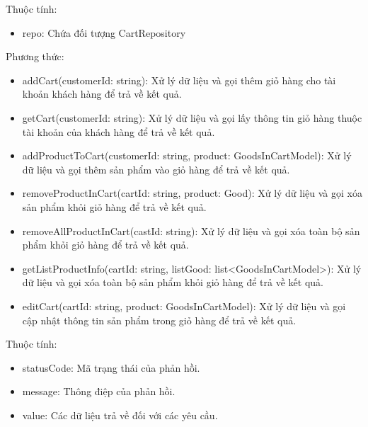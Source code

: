 Thuộc tính:
\begin{itemize}
	\item repo: Chứa đối tượng CartRepository
\end{itemize}
Phương thức:
\begin{itemize}
	\item addCart(customerId: string): Xử lý dữ liệu và gọi thêm giỏ hàng cho tài khoản khách hàng để trả về kết quả.
	\item getCart(customerId: string): Xử lý dữ liệu và gọi lấy thông tin giỏ hàng thuộc tài khoản của khách hàng để trả về kết quả.
	\item addProductToCart(customerId: string, product: GoodsInCartModel): Xử lý dữ liệu và gọi thêm sản phẩm vào giỏ hàng để trả về kết quả.
	\item removeProductInCart(cartId: string, product: Good): Xử lý dữ liệu và gọi xóa sản phẩm khỏi giỏ hàng để trả về kết quả.
	\item removeAllProductInCart(castId: string): Xử lý dữ liệu và gọi xóa toàn bộ sản phẩm khỏi giỏ hàng để trả về kết quả.
	\item getListProductInfo(cartId: string, listGood: list<GoodsInCartModel>): Xử lý dữ liệu và gọi xóa toàn bộ sản phẩm khỏi giỏ hàng để trả về kết quả.
	\item editCart(cartId: string, product: GoodsInCartModel): Xử lý dữ liệu và gọi cập nhật thông tin sản phẩm trong giỏ hàng để trả về kết quả.
\end{itemize}

Thuộc tính:
\begin{itemize}
	\item statusCode: Mã trạng thái của phản hồi.
	\item message: Thông điệp của phản hồi.
	\item value: Các dữ liệu trả về đối với các yêu cầu.
\end{itemize}

\newpage



